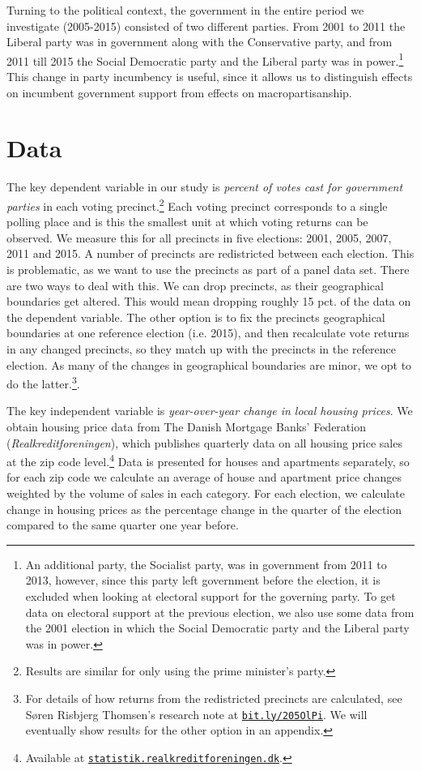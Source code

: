 \documentclass[12pt,a4paper]{article}
\begin{document}
Turning to the political context, the government in the entire period we investigate (2005-2015) consisted of two different parties. From 2001 to 2011 the Liberal party was in government along with the Conservative party, and from 2011 till 2015 the Social Democratic party and the Liberal party was in power.\footnote{An additional party, the Socialist party, was in government from 2011 to 2013, however, since this party left government before the election, it is excluded when looking at electoral support for the governing party. To get data on electoral support at the previous election, we also use some data from the 2001 election in which the Social Democratic party and the Liberal party was in power.} This change in party incumbency is useful, since it allows us to distinguish effects on incumbent government support from effects on macropartisanship. 


\section{Data}
The key dependent variable in our study is \textit{percent of votes cast for government parties} in each voting precinct.\footnote{Results are similar for only using the prime minister's party.} Each voting precinct corresponds to a single polling place and is this the smallest unit at which voting returns can be observed. We measure this for all precincts in five elections: 2001, 2005, 2007, 2011 and 2015. A number of precincts are redistricted between each election. This is problematic, as we want to use  the precincts as part of a panel data set. There are two ways to deal with this. We can drop precincts, as their geographical boundaries get altered. This would mean dropping roughly 15 pct. of the data on the dependent variable. The other option is to fix the precincts geographical boundaries at one reference election (i.e. 2015), and then recalculate vote returns in any changed precincts, so they match up with the precincts in the reference election.  As many of the changes in geographical boundaries are minor, we opt to do the latter.\footnote{For details of how returns from the redistricted precincts are calculated, see Søren Risbjerg Thomsen's research note at \texttt{\href{http://bit.ly/205OlPi}{bit.ly/205OlPi}}. We will eventually show results for the other option in an appendix.}. 

The key independent variable is \textit{year-over-year change in local housing prices}. We obtain housing price data from The Danish Mortgage Banks' Federation (\textit{Realkreditforeningen}), which publishes quarterly data on all housing price sales at the zip code level.\footnote{Available at \texttt{\href{http://statistik.realkreditforeningen.dk/}{statistik.realkreditforeningen.dk}}.} Data is presented for houses and apartments separately, so for each zip code we calculate an average of house and apartment price changes weighted by the volume of sales in each category. For each election, we calculate change in housing prices as the percentage change in the quarter of the election compared to the same quarter one year before.
\end{document}
